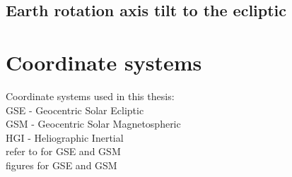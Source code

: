 \subsection*{Earth rotation axis tilt to the ecliptic}


\section{Coordinate systems}
\label{sec:coordinate_systems}

Coordinate systems used in this thesis:\\
GSE - Geocentric Solar Ecliptic\\
GSM - Geocentric Solar Magnetospheric\\
HGI - Heliographic Inertial\\

refer to \citet{Hapgood1992} for GSE and GSM\\

figures for GSE and GSM



  

